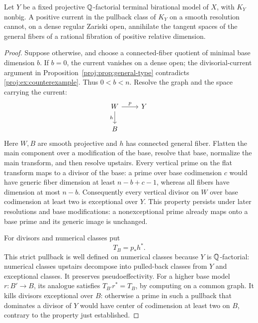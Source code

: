 \begin{proposition}\label{proj:prop:no-pullback}
Let \(Y\) be a fixed projective \(\mathbb{Q}\)-factorial terminal
birational model of \(X\), with \(K_Y\) nonbig. A positive current
in the pullback class of \(K_Y\) on a smooth resolution cannot,
on a dense regular Zariski open, annihilate the tangent spaces
of the general fibers of a rational fibration of positive
relative dimension.
\end{proposition}
\begin{proof}
Suppose otherwise, and choose a connected-fiber quotient of
minimal base dimension \(b\). If \(b=0\), the current vanishes on
a dense open; the divisorial-current argument in
Proposition~\ref{proj:prop:general-type} contradicts
\eqref{proj:ex:counterexample}. Thus \(0<b<n\).
Resolve the graph and the space carrying the current:
\[
 \begin{tikzcd}
 W \arrow[r,"p"] \arrow[d,"h"'] & Y \\
 B &
 \end{tikzcd}
\]
Here \(W,B\) are smooth projective and \(h\) has connected
general fiber. Flatten the main component over a modification of
the base, resolve that base, normalize the main transform, and
then resolve upstairs. Every vertical prime on the flat
transform maps to a divisor of the base: a prime over base
codimension \(c\) would have generic fiber dimension at least
\(n-b+c-1\), whereas all fibers have dimension at most \(n-b\).
Consequently every vertical divisor
on \(W\) over base codimension at least two is exceptional over
\(Y\). This property persists under later resolutions and base
modifications: a nonexceptional prime already maps onto a base
prime and its generic image is unchanged.

For divisors and numerical classes put
\[
 T_B=p_*h^*.
\]
This strict pullback is well defined on numerical classes because
\(Y\) is \(\mathbb{Q}\)-factorial: numerical classes upstairs decompose
into pulled-back classes from \(Y\) and exceptional classes.
It preserves pseudoeffectivity. For a higher base model
\(r:B'\to B\), its analogue satisfies
\(T_{B'}r^*=T_B\), by computing on a common graph.
It kills divisors exceptional over \(B\): otherwise a prime
in such a pullback that dominates a divisor of \(Y\) would
have center of codimension at least two on \(B\), contrary
to the property just established.


\end{proof}

